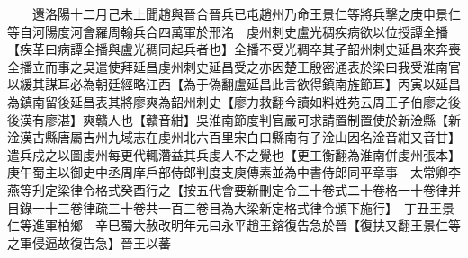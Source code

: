 　　還洛陽十二月己未上聞趙與晉合晉兵已屯趙州乃命王景仁等將兵擊之庚申景仁等自河陽度河會羅周翰兵合四萬軍於邢洺　虔州刺史盧光稠疾病欲以位授譚全播【疾革曰病譚全播與盧光稠同起兵者也】全播不受光稠卒其子韶州刺史延昌來奔喪全播立而事之吳遣使拜延昌虔州刺史延昌受之亦因楚王殷密通表於梁曰我受淮南官以緩其謀耳必為朝廷經略江西【為于偽翻盧延昌此言欲得鎮南旌節耳】丙寅以延昌為鎮南留後延昌表其將廖爽為韶州刺史【廖力救翻今讀如料姓苑云周王子伯廖之後後漢有廖湛】爽贛人也【贛音紺】吳淮南節度判官嚴可求請置制置使於新淦縣【新淦漢古縣唐屬吉州九域志在虔州北六百里宋白曰縣南有子淦山因名淦音紺又音甘】遣兵戍之以圖虔州每更代輒濳益其兵虔人不之覺也【更工衡翻為淮南併虔州張本】　庚午蜀主以御史中丞周庠戶部侍郎判度支庾傳素並為中書侍郎同平章事　太常卿李燕等刋定梁律令格式癸酉行之【按五代會要新刪定令三十卷式二十卷格一十卷律并目錄一十三卷律疏三十卷共一百三卷目為大梁新定格式律令頒下施行】　丁丑王景仁等進軍柏鄉　辛巳蜀大赦改明年元曰永平趙王鎔復告急於晉【復扶又翻王景仁等之軍侵逼故復告急】晉王以蕃


